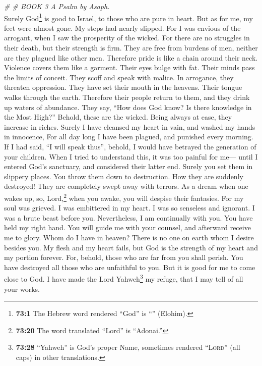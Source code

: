 \emph{\# \# BOOK 3 A Psalm by Asaph.}\\
 Surely God\footnote{\textbf{73:1} The Hebrew word
  rendered ``God'' is ``'' (Elohim).} is good to Israel,
to those who are pure in heart.  But as for me, my feet
were almost gone. My steps had nearly slipped.  For I was
envious of the arrogant, when I saw the prosperity of the wicked.
 For there are no struggles in their death, but their
strength is firm.  They are free from burdens of men,
neither are they plagued like other men.  Therefore pride
is like a chain around their neck. Violence covers them like a garment.
 Their eyes bulge with fat. Their minds pass the limits of
conceit.  They scoff and speak with malice. In arrogance,
they threaten oppression.  They have set their mouth in
the heavens. Their tongue walks through the earth. 
Therefore their people return to them, and they drink up waters of
abundance.  They say, ``How does God know? Is there
knowledge in the Most High?''  Behold, these are the
wicked. Being always at ease, they increase in riches. 
Surely I have cleansed my heart in vain, and washed my hands in
innocence,  For all day long I have been plagued, and
punished every morning.  If I had said, ``I will speak
thus'', behold, I would have betrayed the generation of your children.
 When I tried to understand this, it was too painful for
me---  until I entered God's sanctuary, and considered
their latter end.  Surely you set them in slippery
places. You throw them down to destruction.  How they are
suddenly destroyed! They are completely swept away with terrors.
 As a dream when one wakes up, so, Lord,\footnote{\textbf{73:20}
  The word translated ``Lord'' is ``Adonai.''} when you awake, you will
despise their fantasies.  For my soul was grieved. I was
embittered in my heart.  I was so senseless and ignorant.
I was a brute beast before you.  Nevertheless, I am
continually with you. You have held my right hand.  You
will guide me with your counsel, and afterward receive me to glory.
 Whom do I have in heaven? There is no one on earth whom
I desire besides you.  My flesh and my heart fails, but
God is the strength of my heart and my portion forever. 
For, behold, those who are far from you shall perish. You have destroyed
all those who are unfaithful to you.  But it is good for
me to come close to God. I have made the Lord Yahweh\footnote{\textbf{73:28}
  ``Yahweh'' is God's proper Name, sometimes rendered ``\textsc{Lord}''
  (all caps) in other translations.} my refuge, that I may tell of all
your works.

